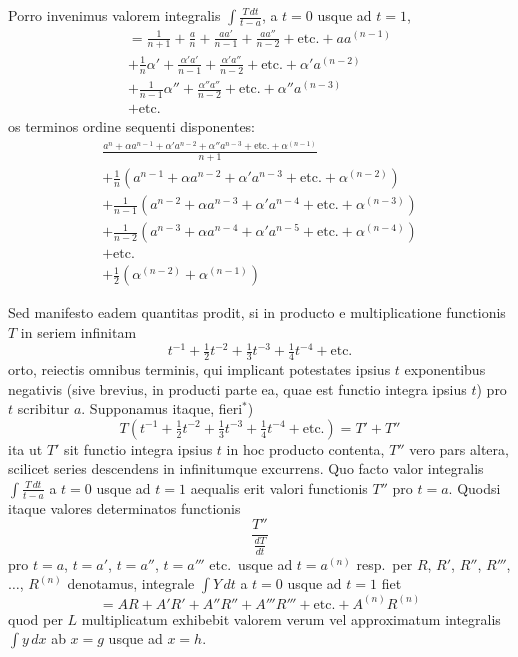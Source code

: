 \documentclass[12pt,a4paper]{article}
\begin{document}
Porro invenimus valorem integralis $\int\!\frac{T\,dt}{t-a}$, a $t=0$ usque ad $t=1$,
\begin{multline*}
= \frac{1}{n+1} + \frac{a}{n} + \frac{aa'}{n-1} + \frac{aa''}{n-2} + \text{etc.} + aa^{(n-1)}\\
+ \frac{1}{n}\alpha' + \frac{\alpha'a'}{n-1} + \frac{\alpha'a''}{n-2} + \text{etc.} + \alpha'a^{(n-2)}\\
+ \frac{1}{n-1}\alpha'' + \frac{\alpha''a''}{n-2} + \text{etc.} + \alpha''a^{(n-3)}\\
+ \text{etc.}
\end{multline*}
os terminos ordine sequenti disponentes:
\begin{multline*}
\frac{a^n+\alpha a^{n-1}+\alpha'a^{n-2}+\alpha''a^{n-3}+\text{etc.}+\alpha^{(n-1)}}{n+1}\\
+ \frac{1}{n}(a^{n-1} + \alpha a^{n-2} + \alpha'a^{n-3} + \text{etc.} + \alpha^{(n-2)})\\
+ \frac{1}{n-1}(a^{n-2} + \alpha a^{n-3} + \alpha'a^{n-4} + \text{etc.} + \alpha^{(n-3)})\\
+ \frac{1}{n-2}(a^{n-3} + \alpha a^{n-4} + \alpha'a^{n-5} + \text{etc.} + \alpha^{(n-4)})\\
+ \text{etc.}\\
+ \frac{1}{2}(\alpha^{(n-2)} + \alpha^{(n-1)})
\end{multline*}

Sed manifesto eadem quantitas prodit, si in producto e multiplicatione functionis $T$ in seriem infinitam
\[
t^{-1} + \tfrac{1}{2}t^{-2} + \tfrac{1}{3}t^{-3} + \tfrac{1}{4}t^{-4} + \text{etc.}
\]
orto, reiectis omnibus terminis, qui implicant potestates ipsius $t$ exponentibus negativis (sive brevius, in producti parte ea, quae est functio integra ipsius $t$) pro $t$ scribitur $a$. Supponamus itaque, fieri$^*$)
\[
T(t^{-1} + \tfrac{1}{2}t^{-2} + \tfrac{1}{3}t^{-3} + \tfrac{1}{4}t^{-4} + \text{etc.}) = T' + T''
\]
ita ut $T'$ sit functio integra ipsius $t$ in hoc producto contenta, $T''$ vero pars altera, scilicet series descendens in infinitumque excurrens. Quo facto valor integralis $\int\!\frac{T\,dt}{t-a}$ a $t=0$ usque ad $t=1$ aequalis erit valori functionis $T''$ pro $t=a$. Quodsi itaque valores determinatos functionis
\[
\frac{T''}{\frac{dT}{dt}}
\]
pro $t=a$, $t=a'$, $t=a''$, $t=a'''$ etc.\ usque ad $t=a^{(n)}$ resp.\ per $R$, $R'$, $R''$, $R'''$, $\ldots$, $R^{(n)}$ denotamus, integrale $\int\!Y\,dt$ a $t=0$ usque ad $t=1$ fiet
\[
= AR + A'R' + A''R'' + A'''R''' + \text{etc.} + A^{(n)}R^{(n)}
\]
quod per $L$ multiplicatum exhibebit valorem verum vel approximatum integralis $\int\!y\,dx$ ab $x=g$ usque ad $x=h$.
\end{document}
